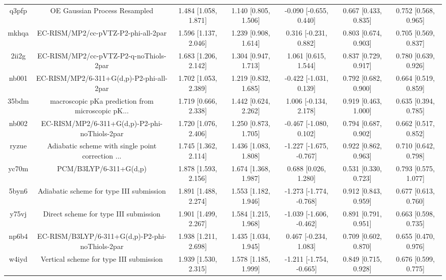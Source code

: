 \documentclass{article}
\begin{document}
\begin{center}
\begin{longtable}{|ccccccc|}
 q3pfp &                      OE Gaussian Process Resampled &  1.484 [1.058, 1.871] &  1.140 [0.805, 1.506] &   -0.090 [-0.655, 0.440] &  0.667 [0.433, 0.835] &   0.752 [0.568, 0.965] \\
 mkhqa &                EC-RISM/MP2/cc-pVTZ-P2-phi-all-2par &  1.596 [1.137, 2.046] &  1.239 [0.908, 1.614] &    0.316 [-0.231, 0.882] &  0.803 [0.674, 0.903] &   0.705 [0.569, 0.837] \\
 2ii2g &             EC-RISM/MP2/cc-pVTZ-P2-q-noThiols-2par &  1.683 [1.206, 2.142] &  1.304 [0.947, 1.713] &     1.061 [0.615, 1.544] &  0.837 [0.729, 0.917] &   0.780 [0.639, 0.926] \\
 nb001 &           EC-RISM/MP2/6-311+G(d,p)-P2-phi-all-2par &  1.702 [1.053, 2.389] &  1.219 [0.832, 1.685] &   -0.422 [-1.031, 0.139] &  0.792 [0.682, 0.900] &   0.664 [0.519, 0.859] \\
 35bdm &  macroscopic pKa prediction from microscopic pK... &  1.719 [0.666, 2.338] &  1.442 [0.624, 2.262] &    1.006 [-0.134, 2.178] &  0.919 [0.463, 1.000] &   0.635 [0.394, 0.785] \\
 nb002 &      EC-RISM/MP2/6-311+G(d,p)-P2-phi-noThiols-2par &  1.720 [1.076, 2.406] &  1.250 [0.873, 1.705] &   -0.467 [-1.080, 0.102] &  0.794 [0.687, 0.902] &   0.662 [0.517, 0.852] \\
 ryzue &  Adiabatic scheme with single point correction ... &  1.745 [1.362, 2.114] &  1.436 [1.083, 1.808] &  -1.227 [-1.675, -0.767] &  0.922 [0.862, 0.963] &   0.710 [0.642, 0.798] \\
 yc70m &                             PCM/B3LYP/6-311+G(d,p) &  1.878 [1.593, 2.156] &  1.674 [1.368, 1.987] &     0.688 [0.026, 1.280] &  0.531 [0.330, 0.723] &   0.793 [0.575, 1.077] \\
 5byn6 &           Adiabatic scheme for type III submission &  1.891 [1.488, 2.274] &  1.553 [1.182, 1.946] &  -1.273 [-1.774, -0.768] &  0.912 [0.843, 0.959] &   0.677 [0.613, 0.760] \\
 y75vj &              Direct scheme for type III submission &  1.901 [1.499, 2.267] &  1.584 [1.215, 1.968] &  -1.039 [-1.606, -0.462] &  0.891 [0.791, 0.951] &   0.663 [0.598, 0.735] \\
 np6b4 &    EC-RISM/B3LYP/6-311+G(d,p)-P2-phi-noThiols-2par &  1.938 [1.211, 2.698] &  1.435 [1.034, 1.945] &    0.467 [-0.234, 1.083] &  0.709 [0.602, 0.870] &   0.655 [0.470, 0.976] \\
 w4iyd &            Vertical scheme for type III submission &  1.939 [1.530, 2.315] &  1.578 [1.185, 1.999] &  -1.211 [-1.754, -0.665] &  0.849 [0.715, 0.928] &   0.676 [0.599, 0.775] \\

\end{longtable}
\end{center}
\end{document}
